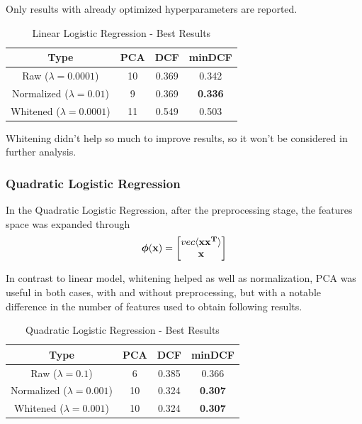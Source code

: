 \documentclass[12pt, twocolumn]{article}
\begin{document}
Only results with already optimized hyperparameters are reported.
\begin{table}[H]
    \centering
    \tiny
        \begin{tabular}{||c|c|c|c||}
            \hline
            Type & PCA & DCF & minDCF \\
            \hline
            \hline
            Raw ($\lambda = 0.0001$) & 10 & 0.369 &  0.342  \\
            Normalized ($\lambda = 0.01$) & 9 & 0.369 &  {\bf 0.336}  \\
            Whitened ($\lambda = 0.0001$) & 11 & 0.549 &  0.503  \\
            \hline
    \end{tabular}
    \caption{Linear Logistic Regression - Best Results}
\end{table}

Whitening didn't help so much to improve results, so it won't be considered in further analysis.
\subsubsection{Quadratic Logistic Regression}

In the Quadratic Logistic Regression, after the preprocessing stage, the features space
was expanded through 
$$ {\bf \boldsymbol{\phi}(x)} = {
    \begin{bmatrix}
    vec\langle{\bf xx^T}\rangle\\
    {\bf x}
    \end{bmatrix}}
$$ 

In contrast to linear model, whitening helped as well as normalization, PCA
was useful in both cases, with and without preprocessing, but with a notable difference
in the number of features used to obtain following results.

\begin{table}[H]
    \tiny
    \centering
        \begin{tabular}{||c|c|c|c||}
            \hline
            Type & PCA & DCF & minDCF \\
            \hline
            \hline
            Raw ($\lambda = 0.1$) & 6 & 0.385 &  0.366  \\
            Normalized ($\lambda = 0.001$) & 10 & 0.324 &  {\bf 0.307}  \\
            Whitened ($\lambda = 0.001$) & 10 & 0.324 &  {\bf 0.307}  \\
            \hline
    \end{tabular}
    \caption{Quadratic Logistic Regression - Best Results}
\end{table}
\end{document}
